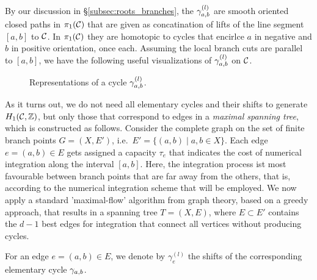 \documentclass[main.tex]{subfiles}
\begin{document}
   By our discussion in \S \ref{subsec:roots_branches}, the $\gamma_{a,b}^{(l)}$ are smooth oriented closed paths in $\pi_1(\mathcal{C})$ that are given as concatination of
   lifts of the line segment $[a,b]$ to $\mathcal{C}$. \abstand
   In $\pi_1(\mathcal{C})$
   they are homotopic to cycles that encirlce  $a$ in negative and $b$ in positive orientation, once each.
   Assuming the local branch cuts are parallel to $[a,b]$, we have the following useful visualizations of $\gamma_{a,b}^{(l)}$ on $\mathcal{C}$.
   \begin{figure}[H]
      \begin{center}
   
      \end{center}
    \caption{Representations of a cycle $\gamma_{a,b}^{(l)}$.}
    \label{fig:elem_cycle}
\end{figure}

  \bigskip

  As it turns out, we do not need all elementary cycles and their shifts to generate $H_1(\mathcal{C},\mathbb{Z})$, but only those that correspond to edges in a \emph{maximal spanning tree}, which is constructed
  as follows. \abstand
   Consider the complete graph on the set of finite branch points $G = (X,E')$, i.e.\ $E' = \{  (a,b)  \mid  a,b \in X \}$.
   Each edge $e = (a,b) \in E$ gets assigned a capacity $\tau_e$ that indicates the cost of numerical integration along the interval $[a,b]$. \abstand
   Here, the integration process ist most favourable
   between branch points that are far away from the others, that is, according to the
   numerical integration scheme that will be employed. \abstand
   We now apply a standard 'maximal-flow' algorithm from graph theory, based on a greedy approach, that results in a spanning tree $T = (X,E)$, where $E \subset E'$ contains the $d-1$ best edges
   for integration that connect all vertices without producing cycles.

   \bigskip

  For an edge $e = (a,b) \in E$, we denote by $\gamma_e^{(l)}$ the shifts of the corresponding elementary cycle $\gamma_{a,b}$.
\end{document}
